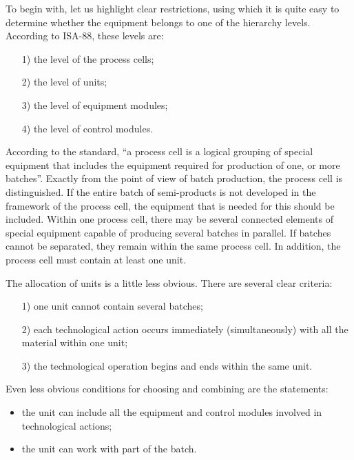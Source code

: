 \documentclass[10pt,twocolumn]{article}
\begin{document}
 
To begin with, let us highlight clear restrictions, using
which it is quite easy to determine whether the equipment
belongs to one of the hierarchy levels. According to ISA-88, these levels are:
\vspace{0.9mm}
\begin{enumerate}
\setlength\itemsep{0em}
\item[1)] the level of the process cells;
\item[2)] the level of units;
\item[3)] the level of equipment modules;
\item[4)] the level of control modules.
\end{enumerate}
\vspace{0.9mm}


According to the standard, “a process cell is a logical
grouping of special equipment that includes the equipment
required for production of one, or more batches”. Exactly
from the point of view of batch production, the process
cell is distinguished. If the entire batch of semi-products
is not developed in the framework of the process cell,
the equipment that is needed for this should be included.
Within one process cell, there may be several connected
elements of special equipment capable of producing several
batches in parallel. If batches cannot be separated, they
remain within the same process cell. In addition, the
process cell must contain at least one unit. 


The allocation of units is a little less obvious. There
are several clear criteria:
\vspace{0.9mm}
\begin{enumerate}
\setlength\itemsep{0em}
\item[1)] one unit cannot contain several batches;

\item[2)] each technological action occurs immediately (simultaneously) with all the material within one unit;
\item[3)] the technological operation begins and ends within
the same unit.
\end{enumerate}
\vspace{0.9mm}
Even less obvious conditions for choosing and combining are the statements:
\vspace{0.9mm}
\begin{itemize}
\setlength\itemsep{0em}
\item the unit can include all the equipment and control
modules involved in technological actions;
\item the unit can work with part of the batch.
\end{itemize}
\vspace{0.9mm}
\end{document}
